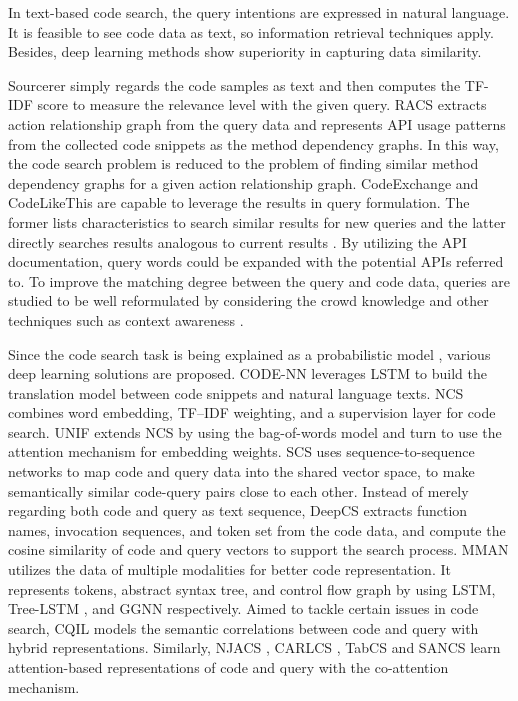 \documentclass[conference]{IEEEtran}
\begin{document}
In text-based code search, the query intentions are expressed in natural language. It is feasible to see code data as text, so information retrieval techniques apply. Besides, deep learning methods show superiority in capturing data similarity.

Sourcerer \cite{Linstead2008SourcererMA} simply regards the code samples as text and then computes the TF-IDF \cite{Haiduc2013AutomaticQR} score to measure the relevance level with the given query. RACS \cite{Li2016RelationshipawareCS} extracts action relationship graph from the query data and represents API usage patterns from the collected code snippets as the method dependency graphs. In this way, the code search problem is reduced to the problem of finding similar method dependency graphs for a given action relationship graph. CodeExchange and CodeLikeThis are capable to leverage the results in query formulation. The former lists characteristics to search similar results for new queries and the latter directly searches results analogous to current results \cite{Martie2017UnderstandingTI}. By utilizing the API documentation, query words could be expanded \cite{Lv2015CodeHowEC,Zhang2018ExpandingQF} with the potential APIs referred to. To improve the matching degree between the query and code data, queries are studied to be well reformulated by considering the crowd knowledge and other techniques such as context awareness \cite{Sirres2017AugmentingAS,Rahman2018EffectiveRO,Rahman2019AutomaticQR,Huang2019EnhanceCS}.

Since the code search task is being explained as a probabilistic model \cite{Allamanis2015BimodalMO}, various deep learning solutions are proposed. CODE-NN \cite{Iyer2016SummarizingSC} leverages LSTM to build the translation model between code snippets and natural language texts. NCS \cite{Sachdev2018RetrievalOS} combines word embedding, TF–IDF weighting, and a supervision layer for code search. UNIF \cite{Cambronero2019WhenDL} extends NCS by using the bag-of-words model and turn to use the attention mechanism for embedding weights. SCS \cite{Husain_2018,GitHub_Blog_2018} uses sequence-to-sequence networks to map code and query data into the shared vector space, to make semantically similar code-query pairs close to each other. Instead of merely regarding both code and query as text sequence, DeepCS \cite{Gu2018DeepCS} extracts function names, invocation sequences, and token set from the code data, and compute the cosine similarity of code and query vectors to support the search process. MMAN \cite{Wan2019MultimodalAN} utilizes the data of multiple modalities for better code representation. It represents tokens, abstract syntax tree, and control flow graph by using LSTM, Tree-LSTM \cite{Tai2015ImprovedSR}, and GGNN \cite{Li2016GatedGS} respectively. Aimed to tackle certain issues in code search, CQIL \cite{Li2020LearningCI} models the semantic correlations between code and query with hybrid representations. Similarly, NJACS \cite{Hu2020NeuralJA}, CARLCS \cite{Shuai2020ImprovingCS}, TabCS \cite{Xu2021TwoStageAM} and SANCS \cite{Fang2021SelfAttentionNF} learn attention-based representations of code and query with the co-attention mechanism.
\end{document}
